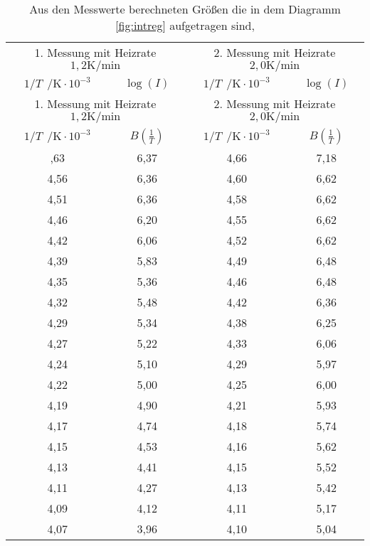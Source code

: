 \begin{longtable}{c c || c c}
  \caption{Aus den Messwerte berechneten Größen die in dem Diagramm \ref{fig:intreg} aufgetragen sind,}
  \label{tab:integral}\\
  \toprule
  \multicolumn{2}{c}{1. Messung mit Heizrate $1,2 \si{\kelvin\per\minute}$ } & \multicolumn{2}{c}{2. Messung mit Heizrate $2,0 \si{\kelvin\per\minute}$ }\\
  $1/T \ \ \si{\per\kelvin} \cdot 10^{-3}$  & $\log(I)$ & $1/T \ \ \si{\per\kelvin} \cdot 10^{-3}$  & $\log(I)$\\
  \midrule
  \endfirsthead
  \hline
  \multicolumn{2}{c}{1. Messung mit Heizrate $1,2 \si{\kelvin\per\minute}$ } & \multicolumn{2}{c}{2. Messung mit Heizrate $2,0 \si{\kelvin\per\minute}$ }\\
  $1/T \ \ \si{\per\kelvin} \cdot 10^{-3}$  & $B(\frac{1}{T})$ & $1/T \ \ \si{\per\kelvin} \cdot 10^{-3}$  & $B(\frac{1}{T})$\\
  \midrule
  \endhead
  \hline
  \endfoot
  \bottomrule
  \endlastfoot
4,63 &       6,37 &  4,66 &        7,18 \\
4,56 &       6,36 &  4,60  &        6,62 \\
4,51 &       6,36 &  4,58 &        6,62 \\
4,46 &       6,20  &  4,55 &        6,62 \\
4,42 &       6,06 &  4,52 &        6,62 \\
4,39 &       5,83 &  4,49 &        6,48 \\
4,35 &       5,36 &  4,46 &        6,48 \\
4,32 &       5,48 &  4,42 &        6,36 \\
4,29 &       5,34 &  4,38 &        6,25 \\
4,27 &       5,22 &  4,33 &        6,06 \\
4,24 &       5,10  &  4,29 &        5,97 \\
4,22 &       5,00    &  4,25 &        6,00    \\
4,19 &       4,90  &  4,21 &        5,93 \\
4,17 &       4,74 &  4,18 &        5,74 \\
4,15 &       4,53 &  4,16 &        5,62 \\
4,13 &       4,41 &  4,15 &        5,52 \\
4,11 &       4,27 &  4,13 &        5,42 \\
4,09 &       4,12 &  4,11 &        5,17 \\
4,07 &       3,96 &  4,10  &        5,04 \\

\end{longtable}
